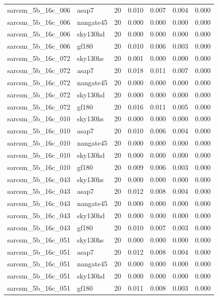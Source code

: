 \begin{tabular}{llrrrrr}
sarcsm\_5b\_16c\_006 & asap7 & 20 & 0.010 & 0.007 & 0.004 & 0.000 \\
sarcsm\_5b\_16c\_006 & nangate45 & 20 & 0.000 & 0.000 & 0.000 & 0.000 \\
sarcsm\_5b\_16c\_006 & sky130hd & 20 & 0.000 & 0.000 & 0.000 & 0.000 \\
sarcsm\_5b\_16c\_006 & gf180 & 20 & 0.010 & 0.006 & 0.003 & 0.000 \\
sarcsm\_5b\_16c\_072 & sky130hs & 20 & 0.001 & 0.000 & 0.000 & 0.000 \\
sarcsm\_5b\_16c\_072 & asap7 & 20 & 0.018 & 0.011 & 0.007 & 0.000 \\
sarcsm\_5b\_16c\_072 & nangate45 & 20 & 0.000 & 0.000 & 0.000 & 0.000 \\
sarcsm\_5b\_16c\_072 & sky130hd & 20 & 0.000 & 0.000 & 0.000 & 0.000 \\
sarcsm\_5b\_16c\_072 & gf180 & 20 & 0.016 & 0.011 & 0.005 & 0.000 \\
sarcsm\_5b\_16c\_010 & sky130hs & 20 & 0.000 & 0.000 & 0.000 & 0.000 \\
sarcsm\_5b\_16c\_010 & asap7 & 20 & 0.010 & 0.006 & 0.004 & 0.000 \\
sarcsm\_5b\_16c\_010 & nangate45 & 20 & 0.000 & 0.000 & 0.000 & 0.000 \\
sarcsm\_5b\_16c\_010 & sky130hd & 20 & 0.000 & 0.000 & 0.000 & 0.000 \\
sarcsm\_5b\_16c\_010 & gf180 & 20 & 0.009 & 0.006 & 0.003 & 0.000 \\
sarcsm\_5b\_16c\_043 & sky130hs & 20 & 0.000 & 0.000 & 0.000 & 0.000 \\
sarcsm\_5b\_16c\_043 & asap7 & 20 & 0.012 & 0.008 & 0.004 & 0.000 \\
sarcsm\_5b\_16c\_043 & nangate45 & 20 & 0.000 & 0.000 & 0.000 & 0.000 \\
sarcsm\_5b\_16c\_043 & sky130hd & 20 & 0.000 & 0.000 & 0.000 & 0.000 \\
sarcsm\_5b\_16c\_043 & gf180 & 20 & 0.010 & 0.007 & 0.003 & 0.000 \\
sarcsm\_5b\_16c\_051 & sky130hs & 20 & 0.000 & 0.000 & 0.000 & 0.000 \\
sarcsm\_5b\_16c\_051 & asap7 & 20 & 0.012 & 0.008 & 0.004 & 0.000 \\
sarcsm\_5b\_16c\_051 & nangate45 & 20 & 0.000 & 0.000 & 0.000 & 0.000 \\
sarcsm\_5b\_16c\_051 & sky130hd & 20 & 0.000 & 0.000 & 0.000 & 0.000 \\
sarcsm\_5b\_16c\_051 & gf180 & 20 & 0.011 & 0.008 & 0.003 & 0.000 \\

\end{tabular}

